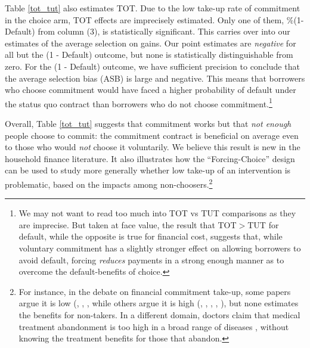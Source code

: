 \documentclass[12pt, a4paper]{article}
\begin{document}
Table \ref{tot_tut} also estimates TOT. Due to the low take-up rate of commitment in the choice arm, TOT effects are imprecisely estimated. Only one of them, \%(1-Default) from column (3), is statistically significant. 
This carries over into our estimates of the average selection on gains. Our point estimates are \emph{negative} for all but the (1 - Default) outcome, but none is statistically distinguishable from zero.  
For the (1 - Default) outcome, we have sufficient precision to conclude that the average selection bias (ASB) is large and negative.
This means that borrowers who choose commitment would have faced a higher probability of default under the status quo contract than borrowers who do not choose commitment.\footnote{We may not want to read too much into TOT vs TUT comparisons as they are imprecise. But taken at face value, the result that TOT$>$TUT for default, while the opposite is true for financial cost, suggests that, while voluntary commitment has a slightly stronger effect on allowing borrowers to avoid default, forcing \textit{reduces} payments in a strong enough manner as to overcome the default-benefits of choice.}  


Overall, Table \ref{tot_tut} suggests that commitment works but that \emph{not enough} people choose to commit: the commitment contract is beneficial on average even to those who would \emph{not} choose it voluntarily. We believe this result is new in the household finance literature. It also illustrates how the ``Forcing-Choice'' design can be used to study more generally whether low take-up of an intervention is problematic, based on the impacts among non-choosers.\footnote{For instance, in the debate on financial commitment take-up, some papers argue it is low (\cite{Ashraf}, \cite{Gine}, \cite{Ted}, \cite{Royer} while others argue it is high (\cite{Kremer}, \cite{Casaburi}, \cite{Alcohol}, \cite{AprajitP&P}, \cite{Pascaline}), but none estimates the benefits for non-takers. In a different domain, doctors claim that medical treatment abandonment is too high in a broad range of diseases \citep{non_adherence}, without knowing the treatment benefits for those that abandon.}
\end{document}
